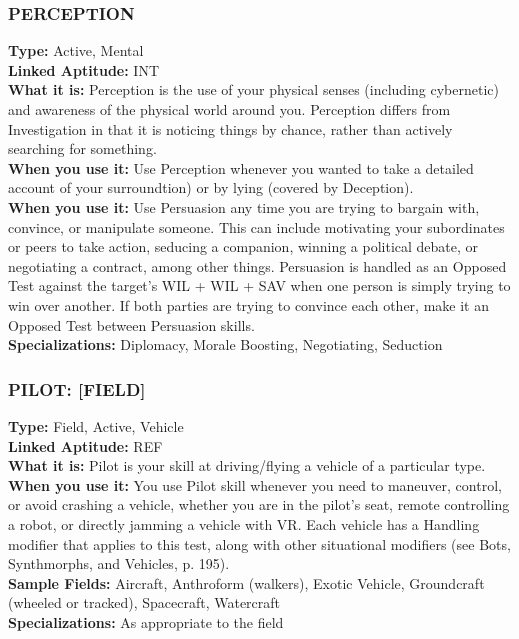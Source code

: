\subsubsection{PERCEPTION} \textbf{Type:} Active, Mental \\ \textbf{Linked Aptitude:} INT \\ \textbf{What it is:} Perception is the use of your physical senses (including cybernetic) and awareness of the physical world around you. Perception differs from Investigation in that it is noticing things by chance, rather than actively searching for something. \\ \textbf{When you use it:} Use Perception whenever you wanted to take a detailed account of your surroundtion) or by lying (covered by Deception). \\ \textbf{When you use it:} Use Persuasion any time you are trying to bargain with, convince, or manipulate someone. This can include motivating your subordinates or peers to take action, seducing a companion, winning a political debate, or negotiating a contract, among other things. Persuasion is handled as an Opposed Test against the target’s WIL + WIL + SAV when one person is simply trying to win over another. If both parties are trying to convince each other, make it an Opposed Test between Persuasion skills. \\ \textbf{Specializations:} Diplomacy, Morale Boosting, Negotiating, Seduction 

\subsubsection{PILOT: [FIELD]} \textbf{Type:} Field, Active, Vehicle \\ \textbf{Linked Aptitude:} REF \\ \textbf{What it is:} Pilot is your skill at driving/flying a vehicle of a particular type. \\ \textbf{When you use it:} You use Pilot skill whenever you need to maneuver, control, or avoid crashing a vehicle, whether you are in the pilot’s seat, remote controlling a robot, or directly jamming a vehicle with VR. Each vehicle has a Handling modifier that applies to this test, along with other situational modifiers (see Bots, Synthmorphs, and Vehicles, p. 195). \\ \textbf{Sample Fields:} Aircraft, Anthroform (walkers), Exotic Vehicle, Groundcraft (wheeled or tracked), Spacecraft, Watercraft \\ \textbf{Specializations:} As appropriate to the field 

